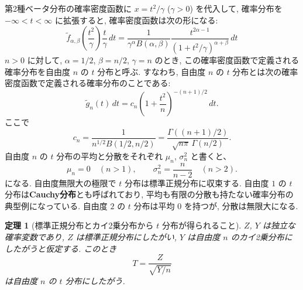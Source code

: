 \documentclass[12pt,twoside]{jarticle}
\newcommand\tf{{\tilde f}}
\newcommand\tg{{\tilde g}}
\theoremstyle{jplain}
\newtheorem{theorem}{定理}
\theoremstyle{jplain}
\theoremstyle{jplain}
\numberwithin{theorem}{section}
\numberwithin{equation}{section}
\numberwithin{figure}{section}
\numberwithin{table}{section}
\begin{document}
第2種ベータ分布の確率密度函数に $x=t^2/\gamma$ ($\gamma>0$) を代入して, 
確率分布を $-\infty<t<\infty$ に拡張すると, 確率密度函数は次の形になる: 
\[
\tf_{\alpha,\beta}\left(\frac{t^2}{\gamma}\right)\frac{t}{\gamma}\,dt
=\frac{1}{\gamma^\alpha B(\alpha,\beta)}\frac{t^{2\alpha-1}}{(1+t^2/\gamma)^{\alpha+\beta}}\,dt
\]
$n>0$ に対して, 
$\alpha=1/2$, $\beta=n/2$, $\gamma=n$ のとき, この確率密度函数で定義される
確率分布を自由度 $n$ の $t$ 分布と呼ぶ.
すなわち, 自由度 $n$ の $t$ 分布とは次の確率密度函数で定義される確率分布のことである:
\[
\tg_n(t)\,dt = c_n\left( 1+\frac{t^2}{n} \right)^{-(n+1)/2}\,dt.
\]
ここで
\[
c_n
=\frac{1}{n^{1/2}B(1/2,n/2)}
=\frac{\Gamma((n+1)/2)}{\sqrt{n\pi}\,\Gamma(n/2)}.
\]
自由度 $n$ の $t$ 分布の平均と分散をそれぞれ $\mu_n$, $\sigma_n^2$ と書くと、
\[
\mu_n = 0 \quad (n>1), \qquad
\sigma_n^2 = \frac{n}{n-2} \quad (n>2).
\]
になる.  自由度無限大の極限で $t$ 分布は標準正規分布に収束する.
自由度 $1$ の $t$ 分布は{\bf Cauchy分布}とも呼ばれており, 
平均も有限の分散も持たない確率分布の典型例になっている.
自由度 $2$ の $t$ 分布は平均 $0$ を持つが, 分散は無限大になる.

\begin{theorem}[標準正規分布とカイ2乗分布から $t$ 分布が得られること]
\label{theorem:t}
$Z$, $Y$ は独立な確率変数であり, 
$Z$ は標準正規分布にしたがい, 
$Y$ は自由度 $n$ のカイ2乗分布にしたがうと仮定する.
このとき
\[
T = \frac{Z}{\sqrt{Y/n}}
\]
は自由度 $n$ の $t$ 分布にしたがう.
\end{theorem}
\end{document}
